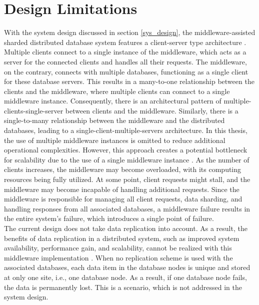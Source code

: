 \section{Design Limitations}
\label{sys_design_limits}

With the system design discussed in section \ref{sys_design}, the middleware-assisted sharded distributed database system features a client-server type architecture \cite{geihs2001middleware}. Multiple clients connect to a single instance of the middleware, which acts as a server for the connected clients and handles all their requests. The middleware, on the contrary, connects with multiple databases, functioning as a single client for these database servers. This results in a many-to-one relationship between the clients and the middleware, where multiple clients can connect to a single middleware instance. Consequently, there is an architectural pattern of multiple-clients-single-server between clients and the middleware. Similarly, there is a single-to-many relationship between the middleware and the distributed databases, leading to a single-client-multiple-servers architecture. In this thesis, the use of multiple middleware instances is omitted to reduce additional operational complexities. However, this approach creates a potential bottleneck for scalability due to the use of a single middleware instance \cite{geihs2001middleware}. As the number of clients increases, the middleware may become overloaded, with its computing resources being fully utilized. At some point, client requests might stall, and the middleware may become incapable of handling additional requests. Since the middleware is responsible for managing all client requests, data sharding, and handling responses from all associated databases, a middleware failure results in the entire system's failure, which introduces a single point of failure. \\

\noindent The current design does not take data replication into account. As a result, the benefits of data replication in a distributed system, such as improved system availability, performance gain, and scalability, cannot be realized with this middleware implementation \cite{ozsu1999principles}. When no replication scheme is used with the associated databases, each data item in the database nodes is unique and stored at only one site, i.e., one database node. As a result, if one database node fails, the data is permanently lost. This is a scenario, which is not addressed in the system design. \\


